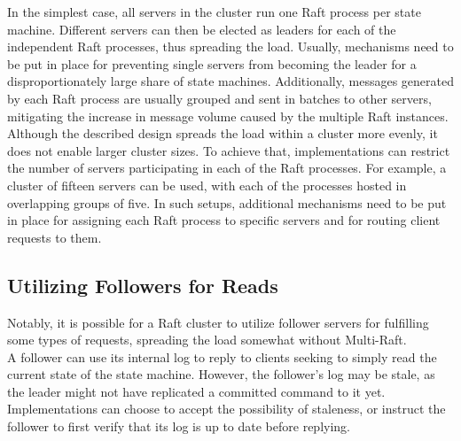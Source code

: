In the simplest case, all servers in the cluster run one Raft process per state machine. Different servers can then be elected as leaders for each of the independent Raft processes, thus spreading the load. Usually, mechanisms need to be put in place for preventing single servers from becoming the leader for a disproportionately large share of state machines. Additionally, messages generated by each Raft process are usually grouped and sent in batches to other servers, mitigating the increase in message volume caused by the multiple Raft instances.\\

Although the described design spreads the load within a cluster more evenly, it does not enable larger cluster sizes. To achieve that, implementations can restrict the number of servers participating in each of the Raft processes. For example, a cluster of fifteen servers can be used, with each of the processes hosted in overlapping groups of five. In such setups, additional mechanisms need to be put in place for assigning each Raft process to specific servers and for routing client requests to them.\\

\subsection{Utilizing Followers for Reads}

Notably, it is possible for a Raft cluster to utilize follower servers for fulfilling some types of requests, spreading the load somewhat without Multi-Raft.\\

A follower can use its internal log to reply to clients seeking to simply read the current state of the state machine. However, the follower's log may be stale, as the leader might not have replicated a committed command to it yet. Implementations can choose to accept the possibility of staleness, or instruct the follower to first verify that its log is up to date before replying.\\